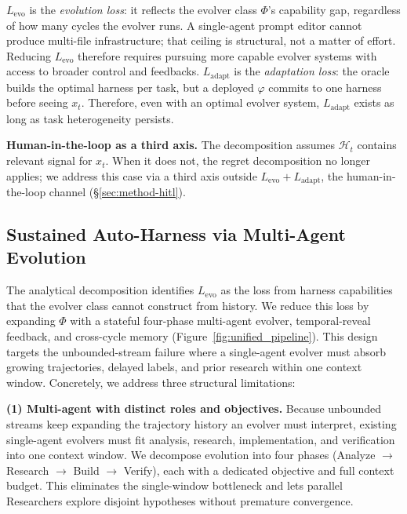\documentclass[11pt]{article}
\theoremstyle{plain}
\newcommand{\Levo}{L_{\text{evo}}}
\newcommand{\Ladapt}{L_{\text{adapt}}}
\newcommand{\Hist}{\mathcal{H}_t}
\begin{document}
$\Levo$ is the \emph{evolution loss}: it reflects the evolver class $\Phi$'s capability gap, regardless of how many cycles the evolver runs. A single-agent prompt editor cannot produce multi-file infrastructure; that ceiling is structural, not a matter of effort. Reducing $\Levo$ therefore requires pursuing more capable evolver systems with access to broader control and feedbacks. $\Ladapt$ is the \emph{adaptation loss}: the oracle builds the optimal harness per task, but a deployed $\varphi$ commits to one harness before seeing $x_t$. Therefore, even with an optimal evolver system, $\Ladapt$ exists as long as task heterogeneity persists.








\noindent\textbf{Human-in-the-loop as a third axis.}
The decomposition assumes $\Hist$ contains relevant signal for $x_t$. When it does not, the regret decomposition no longer applies; we address this case via a third axis outside $\Levo + \Ladapt$, the human-in-the-loop channel (\S\ref{sec:method-hitl}).


\subsection{Sustained Auto-Harness via Multi-Agent Evolution}
\label{sec:method-multi}

The analytical decomposition identifies $\Levo$ as the loss from harness capabilities that the evolver class cannot construct from history. We reduce this loss by expanding $\Phi$ with a stateful four-phase multi-agent evolver, temporal-reveal feedback, and cross-cycle memory (Figure~\ref{fig:unified_pipeline}). This design targets the unbounded-stream failure where a single-agent evolver must absorb growing trajectories, delayed labels, and prior research within one context window. Concretely, we address three structural limitations:

\noindent\textbf{(1) Multi-agent with distinct roles and objectives.}
Because unbounded streams keep expanding the trajectory history an evolver must interpret, existing single-agent evolvers must fit analysis, research, implementation, and verification into one context window. We decompose evolution into four phases (Analyze $\to$ Research $\to$ Build $\to$ Verify), each with a dedicated objective and full context budget. This eliminates the single-window bottleneck and lets parallel Researchers explore disjoint hypotheses without premature convergence.
\end{document}
